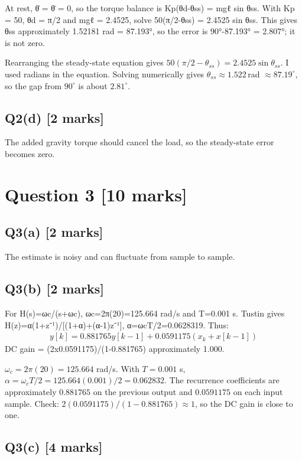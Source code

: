 \documentclass[11pt,a4paper]{article}
\begin{document}
At rest, θ̇ = θ̈ = 0, so the torque balance is Kp(θd-θss) = mgℓ sin θss.
With Kp = 50, θd = π/2 and mgℓ = 2.4525, solve 50(π/2-θss) = 2.4525 sin θss.
This gives θss approximately 1.52181 rad = 87.193°, so the error is 90°-87.193° = 2.807°; it is not zero.\par\smallskip Rearranging the steady-state equation gives $50(\pi/2-\theta_{ss})=2.4525\sin\theta_{ss}$. I used radians in the equation. Solving numerically gives $\theta_{ss}\approx1.522\,$rad $\approx87.19^\circ$, so the gap from $90^\circ$ is about $2.81^\circ$.

\subsection*{Q2(d) \hfill [2 marks]}

The added gravity torque should cancel the load, so the steady-state error becomes zero. 
\section*{Question 3 \hfill [10 marks]}
\subsection*{Q3(a) \hfill [2 marks]}

The estimate is noisy and can fluctuate from sample to sample.

\subsection*{Q3(b) \hfill [2 marks]}

For H(s)=ωc/(s+ωc), ωc=2π(20)=125.664 rad/s and T=0.001 s.
Tustin gives H(z)=α(1+z⁻¹)/[(1+α)+(α-1)z⁻¹], α=ωcT/2=0.0628319.
Thus:\[\begin{aligned}y[k]=0.881765y[k-1]+0.0591175(x_k+x[k-1])\end{aligned}\]
DC gain = (2x0.0591175)/(1-0.881765) approximately 1.000.\par\smallskip $\omega_c=2\pi(20)=125.664$ rad/s. With $T=0.001$ s, $\alpha=\omega_cT/2=125.664(0.001)/2=0.062832$. The recurrence coefficients are approximately $0.881765$ on the previous output and $0.0591175$ on each input sample. Check: $2(0.0591175)/(1-0.881765)\approx1$, so the DC gain is close to one.

\subsection*{Q3(c) \hfill [4 marks]}
\end{document}
